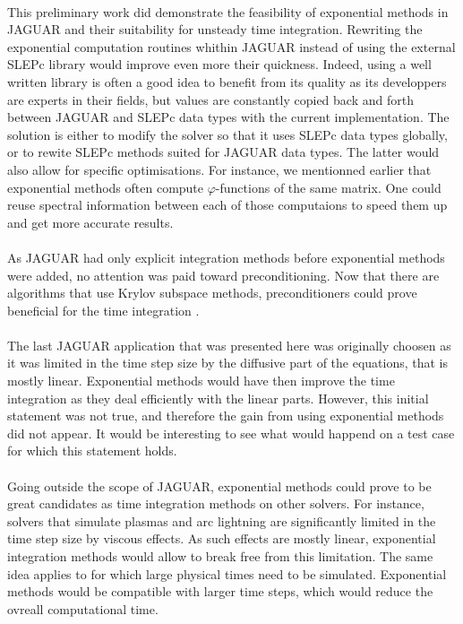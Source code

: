     \paragraph{}
    This preliminary work did demonstrate the feasibility of exponential methods in JAGUAR and their suitability for unsteady time integration.
    Rewriting the exponential computation routines whithin JAGUAR instead of using the external SLEPc library would improve even more their quickness.
    Indeed, using a well written library is often a good idea to benefit from its quality as its developpers are experts in their fields, but values are constantly copied back and forth between JAGUAR and SLEPc data types with the current implementation.
    The solution is either to modify the solver so that it uses SLEPc data types globally, or to rewite SLEPc methods suited for JAGUAR data types.
    The latter would also allow for specific optimisations.
    For instance, we mentionned earlier that exponential methods often compute $\varphi$-functions of the same matrix.
    One could reuse spectral information between each of those computaions to speed them up and get more accurate results.

    \paragraph{}
    As JAGUAR had only explicit integration methods before exponential methods were added, no attention was paid toward preconditioning.
    Now that there are algorithms that use Krylov subspace methods, preconditioners could prove beneficial for the time integration \cite{CastilloSaad1997}.

    \paragraph{}
    The last JAGUAR application that was presented here was originally choosen as it was limited in the time step size by the diffusive part of the equations, that is mostly linear.
    Exponential methods would have then improve the time integration as they deal efficiently with the linear parts.
    However, this initial statement was not true, and therefore the gain from using exponential methods did not appear.
    It would be interesting to see what would happend on a test case for which this statement holds.

    \paragraph{}
    Going outside the scope of JAGUAR, exponential methods could prove to be great candidates as time integration methods on other solvers.
    For instance, solvers that simulate plasmas and arc lightning are significantly limited in the time step size by viscous effects.
    As such effects are mostly linear, exponential integration methods would allow to break free from this limitation.
    The same idea applies to  for which large physical times need to be simulated.
    Exponential methods would be compatible with larger time steps, which would reduce the ovreall computational time.

